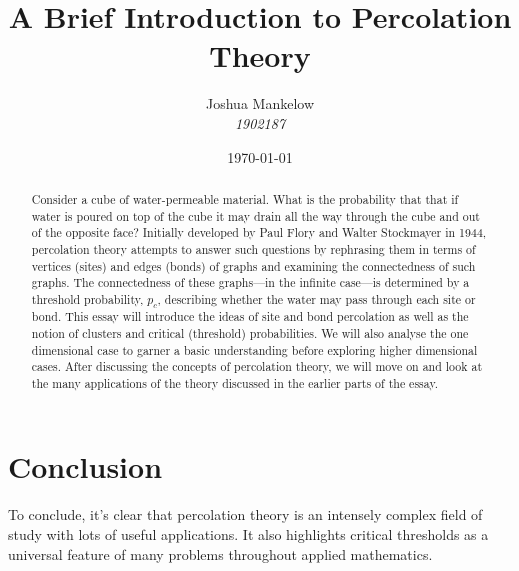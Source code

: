 \documentclass[a4paper,11pt]{article}
\title{\textbf{ A Brief Introduction to Percolation Theory }}
\author{Joshua Mankelow \\ \textit{1902187}}
\date{\today}
\theoremstyle{plain} %
\theoremstyle{definition} %
\theoremstyle{remark} %
\begin{document}
  
\maketitle


\begin{abstract}
  Consider a cube of water-permeable material. What is the probability that that if water is poured on top of the cube it may drain all the way through
  the cube and out of the opposite face? 
  Initially developed by Paul Flory and Walter Stockmayer in 1944, percolation theory attempts to answer such questions by rephrasing them
  in terms of vertices (sites) and edges (bonds) of graphs and examining the connectedness of such graphs. The connectedness of these graphs---in the infinite case---is
  determined by a threshold probability, $p_c$, describing whether the water may pass through each site or bond.
  This essay will introduce the ideas of site and bond percolation as well as the notion of clusters and critical (threshold) probabilities.
  We will also analyse the one dimensional case to garner a basic understanding before exploring higher dimensional cases. After discussing the concepts of percolation theory, we will move on and look at the many applications of the
  theory discussed in the earlier parts of the essay.
\end{abstract}

\newpage

\tableofcontents

\newpage







\section{Conclusion}
To conclude, it's clear that percolation theory is an intensely complex field of study with lots of useful applications. It also highlights critical thresholds as a universal
feature of many problems throughout applied mathematics.

\newpage



\end{document}
